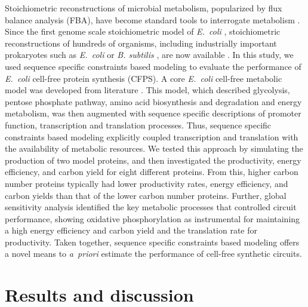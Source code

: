 \documentclass[journal=asbcd6,manuscript=article]{achemso}
\begin{document}
Stoichiometric reconstructions of microbial metabolism, popularized by flux balance analysis (FBA), have become standard tools to interrogate metabolism \cite{2012_lewis_palsson_NatRevMicrobio}.
Since the first genome scale stoichiometric model of \textit{E.~coli} \cite{2000_edwards_palsson_PNAS}, stoichiometric reconstructions of hundreds of organisms, including industrially important prokaryotes such as \textit{E.~coli} \cite{Feist:2007aa} or \textit{B. subtilis} \cite{Oh:2007aa}, are now available \cite{2009_feist_palsson_NatRevMicrobio}.
In this study, we used sequence specific constraints based modeling to evaluate the performance of \emph{E.~coli} cell-free protein synthesis (CFPS).
A core \emph{E.~coli} cell-free metabolic model was developed from literature \cite{Feist:2007aa}.
This model, which described glycolysis, pentose phosphate pathway, amino acid biosynthesis and degradation and energy metabolism, was then augmented with
sequence specific descriptions of promoter function, transcription and translation processes.
Thus, sequence specific constraints based modeling explicitly coupled transcription and translation with the availability of metabolic resources.
We tested this approach by simulating the production of two model proteins, and then investigated the productivity, energy efficiency, and carbon yield for eight different proteins.
From this, higher carbon number proteins typically had lower productivity rates, energy efficiency, and carbon yields than that of the lower carbon number proteins.
Further, global sensitivity analysis identified the key metabolic processes that controlled circuit performance, showing oxidative phosphorylation as instrumental for maintaining a high energy efficiency and carbon yield and the translation rate for productivity.
Taken together, sequence specific constraints based modeling offers a novel means to \emph{a~priori} estimate the performance of cell-free synthetic circuits.

\clearpage

\section{Results and discussion}


\end{document}
